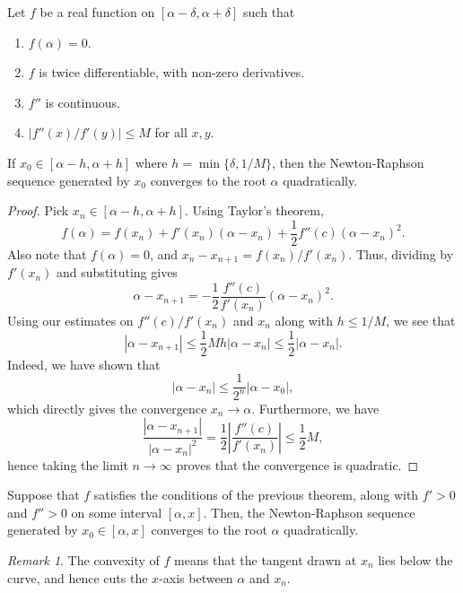 \documentclass[11pt]{article}
\theoremstyle{definition}
\theoremstyle{remark}
\newtheorem*{remark}{Remark}
\numberwithin{equation}{section}
\begin{document}
    \begin{theorem}
        Let $f$ be a real function on $[\alpha - \delta, \alpha + \delta]$ such that
        \begin{enumerate}
            \itemsep0em
            \item $f(\alpha) = 0$.
            \item $f$ is twice differentiable, with non-zero derivatives.
            \item $f''$ is continuous.
            \item $|f''(x) / f'(y)| \leq M$ for all $x, y$.
        \end{enumerate}
        If $x_0 \in [\alpha - h, \alpha + h]$ where $h = \min\{\delta, 1 / M\}$, then
        the Newton-Raphson sequence generated by $x_0$ converges to the root
        $\alpha$ quadratically.
    \end{theorem}
    \begin{proof}
        Pick $x_n \in [\alpha - h, \alpha + h]$. Using Taylor's theorem, \[
            f(\alpha) = f(x_n) + f'(x_n)(\alpha - x_n) + \frac{1}{2}f''(c)(\alpha -
            x_n)^2.
        \] Also note that $f(\alpha) = 0$, and $x_n - x_{n + 1} = f(x_n) / f'(x_n)$.
        Thus, dividing by $f'(x_n)$ and substituting gives \[
            \alpha - x_{n + 1} = -\frac{1}{2}\frac{f''(c)}{f'(x_n)}(\alpha - x_n)^2.
        \] Using our estimates on $f''(c) / f'(x_n)$ and $x_n$ along with $h \leq 1
        / M$, we see that \[
            |\alpha - x_{n + 1}| \leq \frac{1}{2}Mh |\alpha - x_n| \leq \frac{1}{2}
            |\alpha - x_n|.
        \] Indeed, we have shown that \[
            |\alpha - x_n| \leq \frac{1}{2^n}|\alpha - x_0|,
        \] which directly gives the convergence $x_n \to \alpha$. Furthermore, we
        have \[
            \frac{|\alpha - x_{n + 1}|}{|\alpha - x_n|^2} = \frac{1}{2}
            \left|\frac{f''(c)}{f'(x_n)}\right| \leq \frac{1}{2}M,
        \] hence taking the limit $n \to \infty$ proves that the convergence is quadratic.
    \end{proof}
    \begin{corollary}
        Suppose that $f$ satisfies the conditions of the previous theorem, along with
        $f' > 0$ and $f'' > 0$ on some interval $[\alpha, x]$. Then, the
        Newton-Raphson sequence generated by $x_0 \in [\alpha, x]$ converges to the
        root $\alpha$ quadratically.
        \begin{remark}
            The convexity of $f$ means that the tangent drawn at $x_n$ lies below the
            curve, and hence cuts the $x$-axis between $\alpha$ and $x_n$.
        \end{remark}
    \end{corollary}
\end{document}
